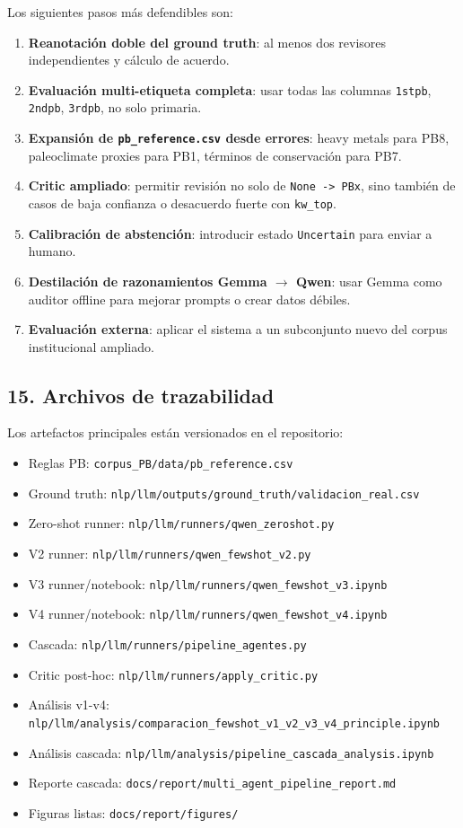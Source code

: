 Los siguientes pasos más defendibles son:

\begin{enumerate}
\item \textbf{Reanotación doble del ground truth}: al menos dos revisores independientes y cálculo de acuerdo.
\item \textbf{Evaluación multi-etiqueta completa}: usar todas las columnas \texttt{1stpb}, \texttt{2ndpb}, \texttt{3rdpb}, no solo primaria.
\item \textbf{Expansión de \texttt{pb\_reference.csv} desde errores}: heavy metals para PB8, paleoclimate proxies para PB1, términos de conservación para PB7.
\item \textbf{Critic ampliado}: permitir revisión no solo de \texttt{None -> PBx}, sino también de casos de baja confianza o desacuerdo fuerte con \texttt{kw\_top}.
\item \textbf{Calibración de abstención}: introducir estado \texttt{Uncertain} para enviar a humano.
\item \textbf{Destilación de razonamientos Gemma $\rightarrow$ Qwen}: usar Gemma como auditor offline para mejorar prompts o crear datos débiles.
\item \textbf{Evaluación externa}: aplicar el sistema a un subconjunto nuevo del corpus institucional ampliado.
\end{enumerate}

\subsection{15. Archivos de trazabilidad}

Los artefactos principales están versionados en el repositorio:

\begin{itemize}
\item Reglas PB: \texttt{corpus\_PB/data/pb\_reference.csv}
\item Ground truth: \texttt{nlp/llm/outputs/ground\_truth/validacion\_real.csv}
\item Zero-shot runner: \texttt{nlp/llm/runners/qwen\_zeroshot.py}
\item V2 runner: \texttt{nlp/llm/runners/qwen\_fewshot\_v2.py}
\item V3 runner/notebook: \texttt{nlp/llm/runners/qwen\_fewshot\_v3.ipynb}
\item V4 runner/notebook: \texttt{nlp/llm/runners/qwen\_fewshot\_v4.ipynb}
\item Cascada: \texttt{nlp/llm/runners/pipeline\_agentes.py}
\item Critic post-hoc: \texttt{nlp/llm/runners/apply\_critic.py}
\item Análisis v1-v4: \texttt{nlp/llm/analysis/comparacion\_fewshot\_v1\_v2\_v3\_v4\_principle.ipynb}
\item Análisis cascada: \texttt{nlp/llm/analysis/pipeline\_cascada\_analysis.ipynb}
\item Reporte cascada: \texttt{docs/report/multi\_agent\_pipeline\_report.md}
\item Figuras listas: \texttt{docs/report/figures/}
\end{itemize}

